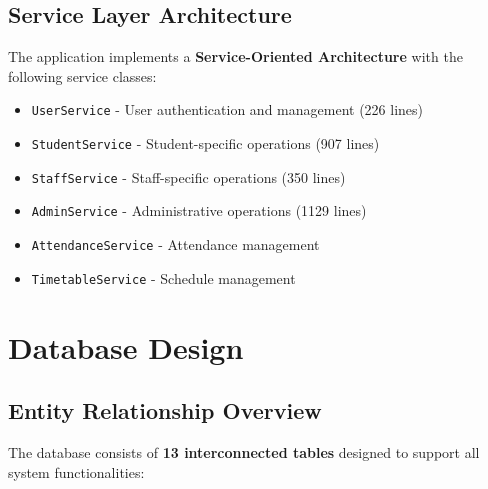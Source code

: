 \documentclass[12pt,a4paper]{article}
\begin{document}
\subsection{Service Layer Architecture}

The application implements a \textbf{Service-Oriented Architecture} with the following service classes:

\begin{itemize}[noitemsep]
    \item \texttt{UserService} - User authentication and management (226 lines)
    \item \texttt{StudentService} - Student-specific operations (907 lines)
    \item \texttt{StaffService} - Staff-specific operations (350 lines)
    \item \texttt{AdminService} - Administrative operations (1129 lines)
    \item \texttt{AttendanceService} - Attendance management
    \item \texttt{TimetableService} - Schedule management
\end{itemize}

\section{Database Design}

\subsection{Entity Relationship Overview}

The database consists of \textbf{13 interconnected tables} designed to support all system functionalities:
\end{document}
